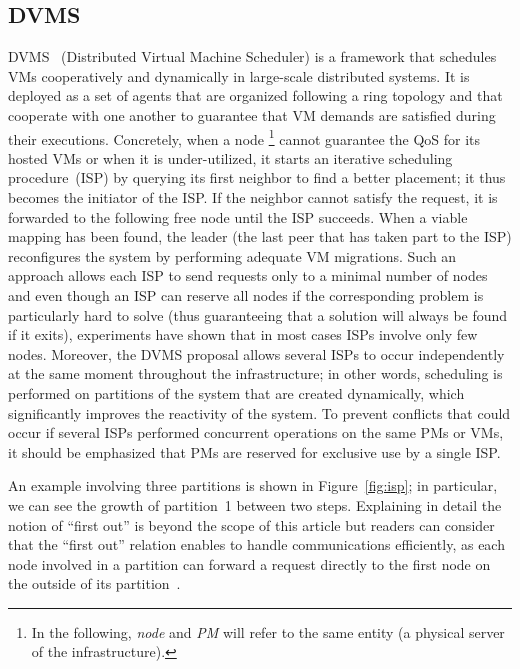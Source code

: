 \subsection{DVMS}\label{ssec:dvms}

DVMS~\cite{quesnel:ispa2013,quesnel:cpe2012} (Distributed Virtual Machine Scheduler) is a
framework that schedules VMs cooperatively and dynamically in large-scale distributed
systems. It is deployed as a set of agents that are organized following a ring topology
and that cooperate with one another to guarantee that VM demands are satisfied during
their executions. Concretely, when a node \footnote{In the following, 
\emph{node} and \emph{PM} will refer to the same entity (\ie a physical 
server of the infrastructure).} cannot guarantee the QoS for its hosted VMs or
when it is under-utilized, it starts an iterative scheduling procedure~(ISP) by querying
its first neighbor to find a better placement; it thus becomes the initiator of the ISP.
If the neighbor cannot satisfy the request, it is forwarded to the following free
node until the ISP succeeds. When a viable mapping has been found, the leader (\ie the last
peer that has taken part to the ISP) reconfigures the system by performing adequate VM
migrations. Such an approach allows each ISP to send requests only to a minimal number of
nodes and even though an ISP can reserve all nodes if the corresponding problem is
particularly hard to solve (thus guaranteeing that a solution will always be found if it
exits), experiments have shown that in most cases ISPs involve only few
nodes. Moreover, the DVMS proposal allows several ISPs to occur independently at the same
moment throughout the infrastructure; in other words, scheduling is performed on
partitions of the system that are created dynamically, which significantly improves the
reactivity of the system. To prevent conflicts that could occur if several ISPs performed
concurrent operations on the same PMs or VMs, it should be emphasized that PMs are reserved for
exclusive use by a single ISP.

An example involving three partitions is shown in Figure~\ref{fig:isp}; in particular, we
can see the growth of partition~1 between two steps. Explaining in detail the notion of
``first out'' is beyond the scope of this article but readers can consider that the
``first out'' relation enables to handle communications efficiently, as each node involved
in a partition can forward a request directly to the first node on the outside of its
partition~\cite{quesnel:cpe2012}.


